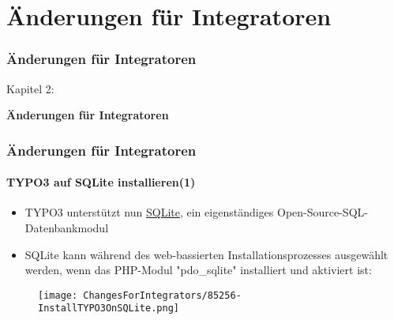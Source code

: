 %

\section{Änderungen für Integratoren}
\begin{frame}[fragile]
	\frametitle{Änderungen für Integratoren}

	\begin{center}\huge{Kapitel 2:}\end{center}
	\begin{center}\huge{\color{typo3darkgrey}\textbf{Änderungen für Integratoren}}\end{center}

\end{frame}


\begin{frame}[fragile]
	\frametitle{Änderungen für Integratoren}
	\framesubtitle{TYPO3 auf SQLite installieren(1)}

	\begin{itemize}
		\item TYPO3 unterstützt nun \href{https://www.sqlite.org}{SQLite},
			ein eigenständiges Open-Source-SQL-Datenbankmodul
		\item SQLite kann während des web-bassierten Installationsprozesses ausgewählt werden,
			wenn das PHP-Modul  "pdo\_sqlite" installiert und aktiviert ist:
	\end{itemize}

	\begin{figure}
		\texttt{[image: ChangesForIntegrators/85256-InstallTYPO3OnSQLite.png]}
	\end{figure}

\end{frame}


